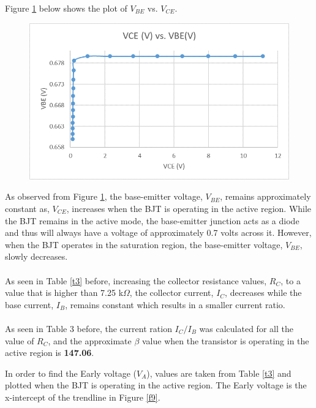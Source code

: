 \documentclass{article}
\begin{document}
	\pagebreak

	\noindent Figure \ref{f8} below shows the plot of $V_{BE}$ vs. $V_{CE}$.
	\begin{figure}[!ht]
		\centering
		\includegraphics[width=0.8\linewidth]{vce_vs_vbe.png}
		\label{f8}
	\end{figure}
	
	\noindent As observed from Figure \ref{f8}, the base-emitter voltage, $V_{BE}$, remains approximately constant as, $V_{CE}$, increases when the BJT is operating in the active region.
	While the BJT remains in the active mode, the base-emitter junction acts as a diode and thus will always have a voltage of approximately 0.7 volts across it.
	However, when the BJT operates in the saturation region, the base-emitter voltage, $V_{BE}$, slowly decreases.\\\\
	As seen in Table \ref{t3} before, increasing the collector resistance values, $R_C$, to a value that is higher than 7.25 k$\Omega$, the collector current, $I_C$, decreases while the base current, $I_B$, remains constant which results in a smaller current ratio.\\\\
	As seen in Table 3 before, the current ration ${I_C}/{I_B}$ was calculated for all the value of $R_C$, and the approximate $\beta$ value when the transistor is operating in the active region is \textbf{147.06}.
	
	\pagebreak
	
	\noindent In order to find the Early voltage ($V_A$), values are taken from Table \ref{t3} and plotted when the BJT is operating in the active region.
	The Early voltage is the x-intercept of the trendline in Figure \ref{f9}.
	
\end{document}
